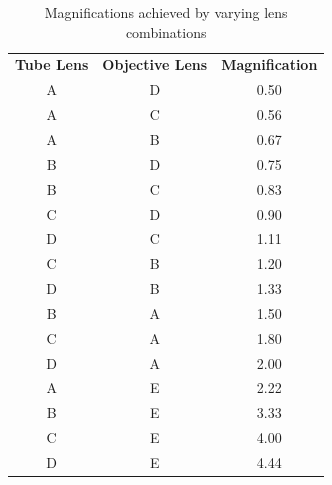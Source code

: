 \documentclass{article}
\begin{document}
\begin{table}[!h]
    \centering
        \begin{tabular}{c c c}
            \textbf{Tube Lens} & \textbf{Objective Lens} & \textbf{Magnification} \\
            A & D & 0.50 \\
            A & C & 0.56 \\
            A & B & 0.67 \\
            B & D & 0.75 \\
            B & C & 0.83 \\
            C & D & 0.90 \\
            D & C & 1.11 \\
            C & B & 1.20 \\
            D & B & 1.33 \\
            B & A & 1.50 \\
            C & A & 1.80 \\
            D & A & 2.00 \\
            A & E & 2.22 \\
            B & E & 3.33 \\
            C & E & 4.00 \\
            D & E & 4.44
        \end{tabular}
    \caption{Magnifications achieved by varying lens combinations}
    \label{tab:magnifications2}
\end{table}
\end{document}
